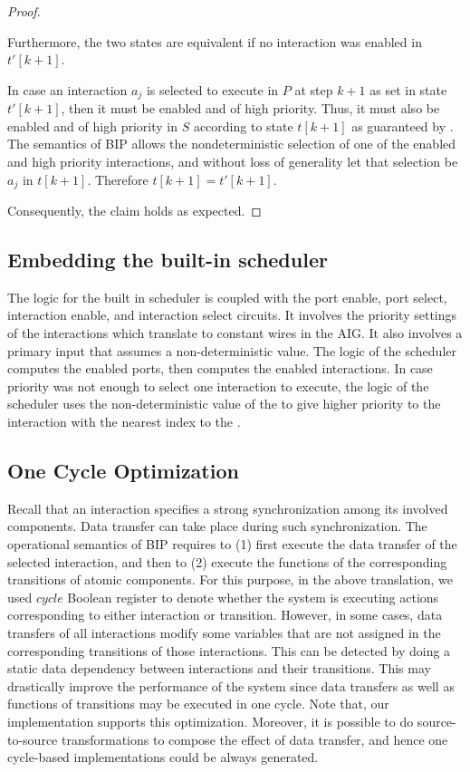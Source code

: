 \begin{proof}
\begin{itemize}
Furthermore, the two states are equivalent if no interaction 
was enabled in $t'[k+1]$. 

In case an interaction $a_j$ is selected to execute in $P$ 
at step $k+1$ as set in state $t'[k+1]$, 
then it must be enabled and of high priority.
Thus, it must also be enabled and of high priority in $S$ 
according to state $t[k+1]$
as guaranteed by . 
The semantics of BIP allows the nondeterministic selection of
one of the enabled and high priority interactions, 
and without loss of generality let that selection 
be $a_j$ in $t[k+1]$. 
Therefore $t[k+1]=t'[k+1]$. 
\end{itemize}
%
Consequently, the claim holds as expected. 
\end{proof}
%


\subsection{Embedding the built-in scheduler}
The logic for the built in scheduler is coupled with the 
port enable, port select, interaction enable, and interaction
select circuits. 
It involves the priority settings of the interactions which 
translate to constant wires in the AIG.
It also involves a  primary input that assumes 
a non-deterministic value. 
The logic of the scheduler computes the enabled ports, then 
computes the enabled interactions. 
In case priority was not enough to select one interaction to 
execute, the logic of the scheduler uses the non-deterministic
value of the  to give higher priority to the
interaction with the nearest index to the .



\subsection{One Cycle Optimization}
%
Recall that an interaction specifies a strong synchronization among its involved components.
Data transfer can take place during such synchronization.
The operational semantics of BIP requires to (1) first execute the data transfer of the selected interaction, and then to (2) execute the functions of the corresponding transitions of atomic components.
For this purpose, in the above translation, we used $\mathit{cycle}$ Boolean register to denote whether the system is executing actions corresponding to either interaction or transition.
However, in some cases, data transfers of all interactions modify some variables that are not assigned in the corresponding transitions of those interactions.
This can be detected by doing a static data dependency between interactions and their transitions. 
This may drastically improve the performance of the system since data transfers as well as functions of transitions may be executed in one cycle. Note that, our implementation supports this optimization. 
Moreover, it is possible to do source-to-source transformations to compose the effect of data transfer, and hence one cycle-based implementations could be always generated.
%
